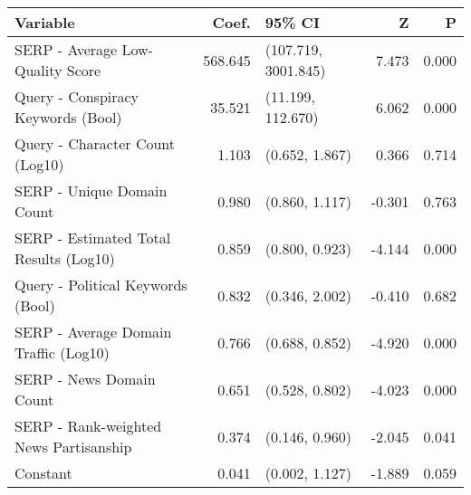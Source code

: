 \begin{tabular}{>{\raggedright\arraybackslash}p{8cm}rlrr}
\toprule
\textbf{Variable} & \textbf{Coef.} & \textbf{95\% CI} & \textbf{Z} & \textbf{P} \\
\midrule
SERP - Average Low-Quality Score & 568.645 & (107.719, 3001.845) & 7.473 & 0.000 \\
Query - Conspiracy Keywords (Bool) & 35.521 & (11.199, 112.670) & 6.062 & 0.000 \\
Query - Character Count (Log10) & 1.103 & (0.652, 1.867) & 0.366 & 0.714 \\
SERP - Unique Domain Count & 0.980 & (0.860, 1.117) & -0.301 & 0.763 \\
SERP - Estimated Total Results (Log10) & 0.859 & (0.800, 0.923) & -4.144 & 0.000 \\
Query - Political Keywords (Bool) & 0.832 & (0.346, 2.002) & -0.410 & 0.682 \\
SERP - Average Domain Traffic (Log10) & 0.766 & (0.688, 0.852) & -4.920 & 0.000 \\
SERP - News Domain Count & 0.651 & (0.528, 0.802) & -4.023 & 0.000 \\
SERP - Rank-weighted News Partisanship & 0.374 & (0.146, 0.960) & -2.045 & 0.041 \\
Constant & 0.041 & (0.002, 1.127) & -1.889 & 0.059 \\
\bottomrule
\end{tabular}
